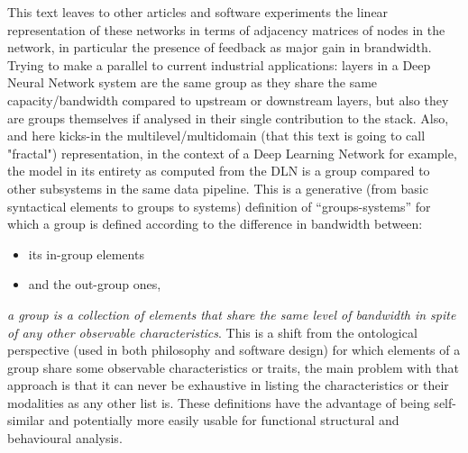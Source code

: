 \documentclass[14pt]{extarticle}
\begin{document}
\hspace*{15mm}This text leaves to other articles and software experiments the linear representation of these networks in terms of adjacency matrices of nodes in the network, in particular the presence of feedback as major gain in brandwidth. Trying to make a parallel to current industrial applications: layers in a Deep Neural Network system are the same group as they share the same capacity/bandwidth compared to upstream or downstream layers, but also they are groups themselves if analysed in their single contribution to the stack. Also, and here kicks-in the multilevel/multidomain (that this text is going to call "fractal") representation, in the context of a Deep Learning Network for example, the model in its entirety as computed from the DLN is a group compared to other subsystems in the same data pipeline.
\newline
\hspace*{15mm}This is a generative (from basic syntactical elements to groups to systems) definition of “groups-systems” for which a group is defined according to the difference in bandwidth between:
\begin{itemize}
\item its in-group elements
\item and the out-group ones,
\end{itemize} 
\textit{a group is a collection of elements that share the same level of bandwidth in spite of any other observable characteristics}.
This is a shift from the ontological perspective (used in both philosophy and software design) for which elements of a group share some observable characteristics or traits, the main problem with that approach is that it can never be exhaustive in listing the characteristics or their modalities as any other list is. These definitions have the advantage of being self-similar and potentially more easily usable for functional structural and behavioural analysis.
\end{document}
